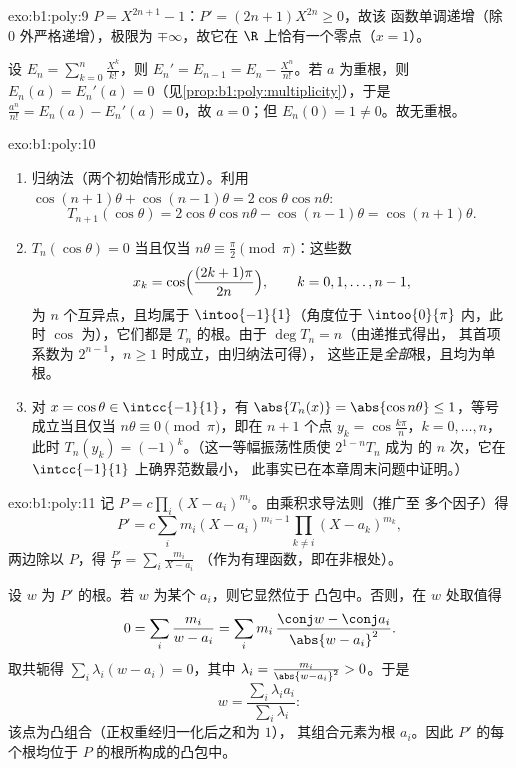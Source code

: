 \begin{solution}{exo:b1:poly:9}
$P = X^{2n+1} - 1$：$P' = (2n+1)X^{2n} \geq 0$，故该
函数单调递增（除 $0$ 外严格递增），极限为
$\mp\infty$，故它在 $\R$ 上恰有一个零点（$x = 1$）。

设 $E_n = \sum_{k=0}^{n} \frac{X^k}{k!}$，则 $E_n' = E_{n-1} = E_n
- \frac{X^n}{n!}$。若 $a$ 为重根，则 $E_n(a) =
E_n'(a) = 0$（见\cref{prop:b1:poly:multiplicity}），于是
$\frac{a^n}{n!} = E_n(a) - E_n'(a) = 0$，故 $a = 0$；但 $E_n(0) = 1
\neq 0$。故无重根。
\end{solution}

\begin{solution}{exo:b1:poly:10}
\begin{enumerate}
  \item 归纳法（两个初始情形成立）。利用 $\cos(n+1)\theta +
        \cos(n-1)\theta = 2\cos\theta\cos n\theta$:
        \[
        T_{n+1}(\cos\theta) = 2\cos\theta \cos n\theta -
        \cos(n-1)\theta = \cos(n+1)\theta .
        \]
  \item $T_n(\cos\theta) = 0$ 当且仅当 $n\theta \equiv \frac\pi2 \pmod
        \pi$：这些数
        \[
        x_k = \cos\Bigl(\frac{(2k+1)\pi}{2n}\Bigr),
        \qquad k = 0, 1, \dots, n-1,
        \]
        为 $n$ 个互异点，且均属于 $\intoo{-1}{1}$（角度位于
        $\intoo{0}{\pi}$ 内，此时 $\cos$ 为），它们都是
        $T_n$ 的根。由于 $\deg T_n = n$（由递推式得出，
        其首项系数为 $2^{n-1}$，$n \geq 1$ 时成立，由归纳法可得），
        这些正是\emph{全部}根，且均为单根。
  \item 对 $x = \cos\theta \in \intcc{-1}{1}$，有 $\abs{T_n(x)} =
        \abs{\cos n\theta} \leq 1$，等号成立当且仅当 $n\theta \equiv
        0 \pmod\pi$，即在 $n+1$ 个点 $y_k =
        \cos\frac{k\pi}{n}$，$k = 0, \dots, n$，此时 $T_n(y_k) =
        (-1)^k$。（这一等幅振荡性质使 $2^{1-n}T_n$ 成为
        的 $n$ 次，它在
        $\intcc{-1}{1}$ 上确界范数最小，
        此事实已在本章周末问题中证明。）
\end{enumerate}
\end{solution}

\begin{solution}{exo:b1:poly:11}
记 $P = c\prod_i (X - a_i)^{m_i}$。由乘积求导法则（推广至
多个因子）得
\[
P' = c\sum_{i} m_i (X - a_i)^{m_i - 1} \prod_{k \neq i} (X -
a_k)^{m_k},
\]
两边除以 $P$，得 $\frac{P'}{P} = \sum_i \frac{m_i}{X - a_i}$
（作为有理函数，即在非根处）。

设 $w$ 为 $P'$ 的根。若 $w$ 为某个 $a_i$，则它显然位于
凸包中。否则，在 $w$ 处取值得
\[
0 = \sum_i \frac{m_i}{w - a_i}
= \sum_i m_i\, \frac{\conj w - \conj a_i}{\abs{w - a_i}^2} .
\]
取共轭得 $\sum_i \lambda_i (w - a_i) = 0$，其中 $\lambda_i =
\frac{m_i}{\abs{w - a_i}^2} > 0$。于是
\[
w = \frac{\sum_i \lambda_i a_i}{\sum_i \lambda_i} :
\]
该点为凸组合（正权重经归一化后之和为 $1$），
其组合元素为根 $a_i$。因此 $P'$ 的每个根均位于
$P$ 的根所构成的凸包中。
\end{solution}

